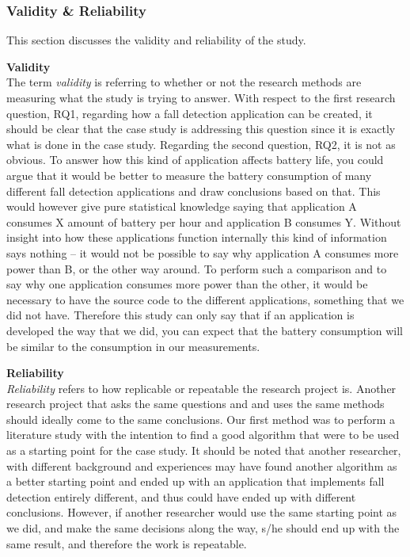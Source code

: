 \documentclass[12pt, a4paper, onecolumn]{article}
\newcommand{\parag}[1]{
	\textbf{#1} \hspace{0pt} \\
}
\begin{document}
	\subsubsection{Validity \& Reliability}
	
	This section discusses the validity and reliability of the study.
	
	\parag{Validity}
	The term \textit{validity} is referring to whether or not the research methods are measuring what the study is trying to answer. With respect to the first research question, RQ1, regarding how a fall detection application can be created, it should be clear that the case study is addressing this question since it is exactly what is done in the case study. Regarding the second question, RQ2, it is not as obvious. To answer how this kind of application affects battery life, you could argue that it would be better to measure the battery consumption of many different fall detection applications and draw conclusions based on that. This would however give pure statistical knowledge saying that application A consumes X amount of battery per hour and application B consumes Y. Without insight into how these applications function internally this kind of information says nothing -- it would not be possible to say why application A consumes more power than B, or the other way around. To perform such a comparison and to say why one application consumes more power than the other, it would be necessary to have the source code to the different applications, something that we did not have. Therefore this study can only say that if an application is developed the way that we did, you can expect that the battery consumption will be similar to the consumption in our measurements.
	
	\parag{Reliability}
	\textit{Reliability} refers to how replicable or repeatable the research project is. Another research project that asks the same questions and and uses the same methods should ideally come to the same conclusions. Our first method was to perform a literature study with the intention to find a good algorithm that were to be used as a starting point for the case study. It should be noted that another researcher, with different background and experiences may have found another algorithm as a better starting point and ended up with an application that implements fall detection entirely different, and thus could have ended up with different conclusions. However, if another researcher would use the same starting point as we did, and make the same decisions along the way, s/he should end up with the same result, and therefore the work is repeatable.
	
\end{document}

